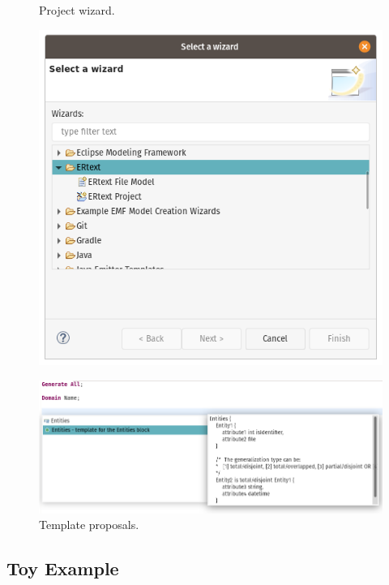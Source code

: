 \begin{figure}[!htb]
  \centering
  \begin{minipage}[b]{0.4\textwidth}
    \caption{Project wizard.}
    \label{fig:wizard}
    \includegraphics[width=\textwidth]{img/Wizard1.png}
  \end{minipage}
  \hfill
  \begin{minipage}[b]{0.55\textwidth}
    \caption{Template proposals.}
    \label{fig:templateProposal}
    \includegraphics[width=\textwidth]{img/CodeSnippetRecomendation.png}
  \end{minipage}
\end{figure}

\subsection{Toy Example}

